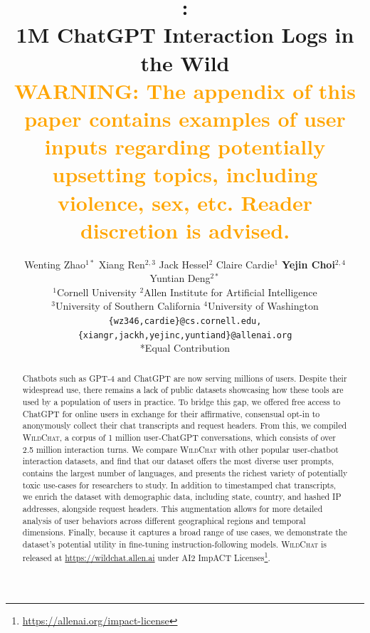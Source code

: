 \documentclass{article} %
\title{\corpus: \\ 1M ChatGPT Interaction Logs in the Wild\\\textcolor{orange}{ \normalsize{WARNING: The appendix of this paper contains examples of user inputs regarding potentially upsetting topics, including violence, sex, etc. Reader discretion is advised.}}}
\author{Wenting Zhao$^{1*}$ Xiang Ren$^{2,3}$ Jack Hessel$^{2}$ Claire Cardie$^{1}$ \textbf{Yejin Choi}$^{2,4}$ Yuntian Deng$^{2*}$\vspace{1mm}\\
$^{1}$Cornell University \hspace{2mm}
$^{2}$Allen Institute for Artificial Intelligence \\
$^{3}$University of Southern California \hspace{2mm} $^{4}$University of Washington\\
\small{\texttt{\{wz346,cardie\}@cs.cornell.edu,\{xiangr,jackh,yejinc,yuntiand\}@allenai.org}}\\
*Equal Contribution}
\newcommand{\corpus}{\textsc{WildChat}\xspace}
\newcommand{\model}{\textsc{WildLlama}\xspace}
\begin{document}

\maketitle

\begin{abstract}
Chatbots such as GPT-4 and ChatGPT are now serving millions of users. Despite their widespread use, there remains a lack of public datasets showcasing how these tools are used by a population of users in practice. 
To bridge this gap, we offered free access to ChatGPT for online users in exchange for their affirmative, consensual opt-in to anonymously collect their chat transcripts and request headers.
From this, we compiled \corpus, a corpus of 1 million user-ChatGPT conversations, which consists of over 2.5 million interaction turns.
We compare \corpus with other popular user-chatbot interaction datasets, and find that our dataset offers the most diverse user prompts, contains the largest number of languages, and presents the richest variety of potentially toxic use-cases for researchers to study.
In addition to timestamped chat transcripts, we enrich the dataset with demographic data, including state, country, and hashed IP addresses, alongside request headers. This augmentation allows for more detailed analysis of user behaviors across different geographical regions and temporal dimensions.
Finally, because it captures a broad range of use cases, we demonstrate the dataset's potential utility in fine-tuning instruction-following models. %
\corpus is released at \url{https://wildchat.allen.ai} under AI2 ImpACT Licenses\footnote{\url{https://allenai.org/impact-license}}.

\end{abstract}
\end{document}
